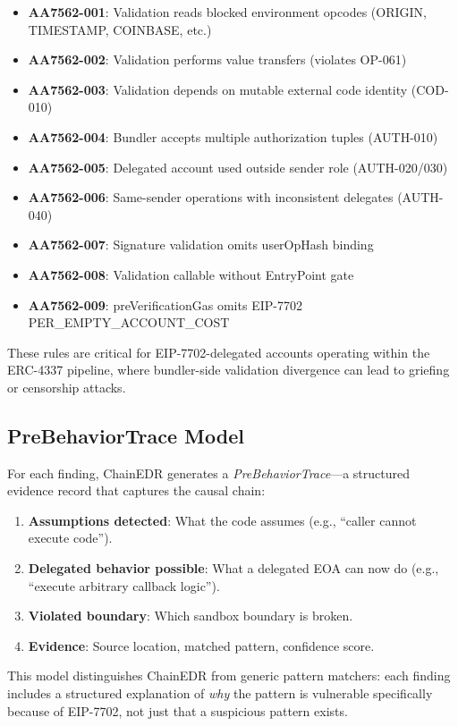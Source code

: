 \begin{itemize}
    \item \textbf{AA7562-001}: Validation reads blocked environment opcodes (ORIGIN, TIMESTAMP, COINBASE, etc.)
    \item \textbf{AA7562-002}: Validation performs value transfers (violates OP-061)
    \item \textbf{AA7562-003}: Validation depends on mutable external code identity (COD-010)
    \item \textbf{AA7562-004}: Bundler accepts multiple authorization tuples (AUTH-010)
    \item \textbf{AA7562-005}: Delegated account used outside sender role (AUTH-020/030)
    \item \textbf{AA7562-006}: Same-sender operations with inconsistent delegates (AUTH-040)
    \item \textbf{AA7562-007}: Signature validation omits userOpHash binding
    \item \textbf{AA7562-008}: Validation callable without EntryPoint gate
    \item \textbf{AA7562-009}: preVerificationGas omits EIP-7702 PER\_EMPTY\_ACCOUNT\_COST
\end{itemize}

These rules are critical for EIP-7702-delegated accounts operating within the ERC-4337 pipeline, where bundler-side validation divergence can lead to griefing or censorship attacks.

\subsection{PreBehaviorTrace Model}

For each finding, ChainEDR generates a \textit{PreBehaviorTrace}---a structured evidence record that captures the causal chain:

\begin{enumerate}
    \item \textbf{Assumptions detected}: What the code assumes (e.g., ``caller cannot execute code'').
    \item \textbf{Delegated behavior possible}: What a delegated EOA can now do (e.g., ``execute arbitrary callback logic'').
    \item \textbf{Violated boundary}: Which sandbox boundary is broken.
    \item \textbf{Evidence}: Source location, matched pattern, confidence score.
\end{enumerate}

This model distinguishes ChainEDR from generic pattern matchers: each finding includes a structured explanation of \textit{why} the pattern is vulnerable specifically because of EIP-7702, not just that a suspicious pattern exists.

